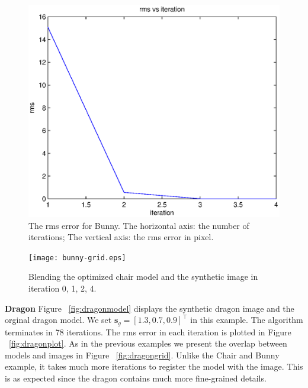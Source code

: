 \documentclass[10pt,twocolumn,letterpaper]{article}
\begin{document}
\begin{figure}[t]
\begin{center}
	\includegraphics[scale=0.55]{bunny-figure.eps}
\end{center}
	\caption{The rms error for Bunny. The horizontal axis: the number of iterations; The vertical axis: the rms error in pixel.}
\label{fig:bunnyplot}
\end{figure}

\begin{figure}
\begin{center}
	\texttt{[image: bunny-grid.eps]}
\end{center}
   \caption{Blending the optimized chair model and the synthetic image in iteration 0, 1, 2, 4.}
\label{fig:bunnygrid}
\end{figure}

\noindent
\textbf{Dragon} Figure ~\ref{fig:dragonmodel} displays the synthetic dragon image and the orginal dragon model. We set $\mathbf{s}_g=[1.3, 0.7, 0.9]^\top$ in this example. The algorithm terminates in 78 iterations. The rms error in each iteration is plotted in Figure ~\ref{fig:dragonplot}. As in the previous examples we present the overlap between models and images in Figure ~\ref{fig:dragongrid}. Unlike the Chair and Bunny example, it takes much more iterations to register the model with the image. This is as expected since the dragon contains much more fine-grained details.
\end{document}
